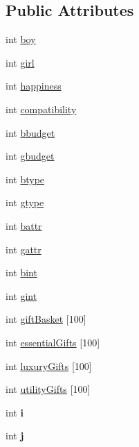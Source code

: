 \subsection*{Public Attributes}
\begin{DoxyCompactItemize}
\item 
int \hyperlink{classCouple_ac7c2e9d064208a632548e229f1b1de3f}{boy}
\item 
int \hyperlink{classCouple_a2e5c780d063c6b1d78121944cb8f054b}{girl}
\item 
int \hyperlink{classCouple_aee78d616688f0cccff84e1c23cb31f7a}{happiness}
\item 
int \hyperlink{classCouple_af47d6ced781259303e10836182abb8c1}{compatibility}
\item 
int \hyperlink{classCouple_ab678c2a69e26feaa566ab67be8767b7f}{bbudget}
\item 
int \hyperlink{classCouple_ad05788712d274549c30b564b4016c91d}{gbudget}
\item 
int \hyperlink{classCouple_aae0ea4e1bc2b28b6f7401c2d74fd658a}{btype}
\item 
int \hyperlink{classCouple_a1758d09993933c65563470d90f63a47d}{gtype}
\item 
int \hyperlink{classCouple_aa9ef47b684fd069ae2ac848d1ef7cef9}{battr}
\item 
int \hyperlink{classCouple_acba8117a9de951fd18038fa23d440e03}{gattr}
\item 
int \hyperlink{classCouple_ad463cc378d8f237eb804c2bc365463c6}{bint}
\item 
int \hyperlink{classCouple_ac8f2a31c9fd86ef6077035f46cc3b6d6}{gint}
\item 
int \hyperlink{classCouple_a2080514dd79fa3bb90695fd295c02429}{gift\+Basket} \mbox{[}100\mbox{]}
\item 
int \hyperlink{classCouple_a2d99d5e38764b95a798b7177d7d64d07}{essential\+Gifts} \mbox{[}100\mbox{]}
\item 
int \hyperlink{classCouple_a7b672637b9c901e1ffcbd27e13a7a57a}{luxury\+Gifts} \mbox{[}100\mbox{]}
\item 
int \hyperlink{classCouple_ab88c6aeb8added9e52bd824e1cacb044}{utility\+Gifts} \mbox{[}100\mbox{]}
\item 
int {\bfseries i}\hypertarget{classCouple_a28c8fce17e5e57695b5666e00d56e978}{}\label{classCouple_a28c8fce17e5e57695b5666e00d56e978}

\item 
int {\bfseries j}\hypertarget{classCouple_a523d74439d1c4a1cdd82eb6cf1bc110b}{}\label{classCouple_a523d74439d1c4a1cdd82eb6cf1bc110b}


\end{DoxyCompactItemize}
